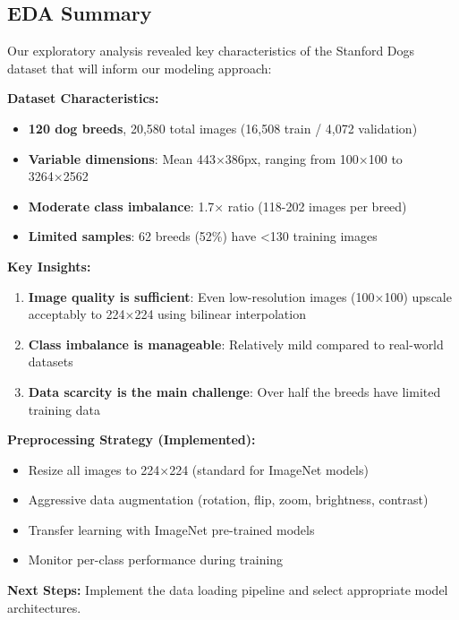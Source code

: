 \documentclass[
  letterpaper,
  DIV=11,
  numbers=noendperiod]{scrartcl}
\providecommand{\tightlist}{%
  \setlength{\itemsep}{0pt}\setlength{\parskip}{0pt}}
\begin{document}
\subsection{EDA Summary}\label{eda-summary}

Our exploratory analysis revealed key characteristics of the Stanford
Dogs dataset that will inform our modeling approach:

\textbf{Dataset Characteristics:}

\begin{itemize}
\tightlist
\item
  \textbf{120 dog breeds}, 20,580 total images (16,508 train / 4,072
  validation)
\item
  \textbf{Variable dimensions}: Mean 443×386px, ranging from 100×100 to
  3264×2562
\item
  \textbf{Moderate class imbalance}: 1.7× ratio (118-202 images per
  breed)
\item
  \textbf{Limited samples}: 62 breeds (52\%) have \textless130 training
  images
\end{itemize}

\textbf{Key Insights:}

\begin{enumerate}
\def\labelenumi{\arabic{enumi}.}
\tightlist
\item
  \textbf{Image quality is sufficient}: Even low-resolution images
  (100×100) upscale acceptably to 224×224 using bilinear interpolation
\item
  \textbf{Class imbalance is manageable}: Relatively mild compared to
  real-world datasets
\item
  \textbf{Data scarcity is the main challenge}: Over half the breeds
  have limited training data
\end{enumerate}

\textbf{Preprocessing Strategy (Implemented):}

\begin{itemize}
\tightlist
\item
  Resize all images to 224×224 (standard for ImageNet models)
\item
  Aggressive data augmentation (rotation, flip, zoom, brightness,
  contrast)
\item
  Transfer learning with ImageNet pre-trained models
\item
  Monitor per-class performance during training
\end{itemize}

\textbf{Next Steps:} Implement the data loading pipeline and select
appropriate model architectures.
\end{document}
